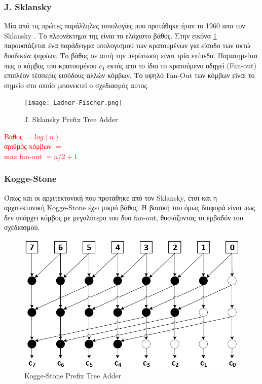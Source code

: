 \subsubsection*{J. Sklansky}
Μία από τις πρώτες παράλληλες τοπολογίες που προτάθηκε ήταν το 1960 απο τον Sklansky \cite{5219822}. Το πλεονέκτημα της είναι το ελάχιστο βάθος. Στην εικόνα \ref{Ladner-FischerTree} παρουσιάζεται ένα παράδειγμα υπολογισμού των κρατουμένων για είσοδο των οκτώ δυαδικών ψηφίων. Το βάθος σε αυτή την περίπτωση είναι τρία επίπεδα. Παρατηρείται πως ο κόμβος του κρατουμένου $c_4$ εκτός απο το ίδιο το κρατούμενο οδηγεί (Fan-out) επιπλέον τέσσερις εισόδους αλλών κόμβων. Το υψηλό Fan-Out των κόμβων είναι το σημείο στο οποίο μειονεκτεί ο σχεδιασμός αυτος.
\begin{figure}[H]
    \centering
    \texttt{[image: Ladner-Fischer.png]}
    \caption{J. Sklansky Prefix Tree Adder}
    \label{Ladner-FischerTree}
\end{figure}
\textcolor{red}{
Βαθος $= log(n)$\\
αριθμός κόμβων $ = $\\
max fan-out $ = n/2 + 1$
}





\subsubsection*{Kogge-Stone}
Όπως και οι αρχιτεκτονική που προτάθηκε από τον Sklansky, έτσι και η αρχιτεκτονική
Kogge-Stone \cite{5009159} έχει μικρό βάθος. Η βασική του όμως διαφορά είναι πως δεν υπάρχει 
κόμβος με μεγαλύτερο του δυο fan-out, θυσιάζοντας το εμβαδόν του σχεδιασμού.
\begin{figure}[H]
    \centering
    \includegraphics[scale=0.45]{Pictures/Kogge-Stone.png}
    \caption{Kogge-Stone Prefix Tree Adder}
    \label{Kogge-StoneTree}
\end{figure}






